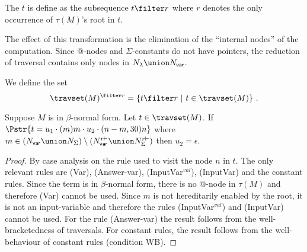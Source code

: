 




\begin{definition}
The  $t$ is define as the subsequence $t\filter r$ where $r$ denotes the only occurrence of $\tau(M)$'s root in $t$.
\end{definition}
The effect of this transformation is the elimination of the
``internal nodes'' of the computation. Since @-nodes and $\Sigma$-constants do not have pointers, the
reduction of traversal contains only nodes in $N_\lambda \union
N_{\sf var}$.

We define the set
$$\travset(M)^{\filter r} = \{ t  \filter r \ | \  t  \in \travset(M) \} \ . $$




\begin{lemma}
\label{lem:var_followedby_child} Suppose $M$ is in $\beta$-normal
form. Let $t \in \travset(M)$. If
$\Pstr{ t = u_1 \cdot (m){m} \cdot u_2 \cdot (n-m,30){n} }$
 where $m \in (N_{\sf var} \union N_{\Sigma}) \setminus (N^{r\vdash}_{\sf var} \union N^{r\vdash}_{\Sigma})$
then $u_2 = \epsilon$.
\end{lemma}
\begin{proof}
By case analysis on the rule used to visit the node
$n$ in $t$. The only relevant rules are (Var), (Answer-var), (InputVar$^{val}$), (InputVar)
and the constant rules.
Since the term is in $\beta$-normal form, there is no @-node in $\tau(M)$ and therefore (Var) cannot be used.
Since $m$ is not hereditarily enabled by the root, it is not an input-variable and therefore the rules (InputVar$^{val}$) and (InputVar) cannot be used.
For the rule (Answer-var) the result follows from the well-bracketedness of traversals.
For constant rules, the result follows from the well-behaviour of constant rules (condition WB).
\end{proof}

